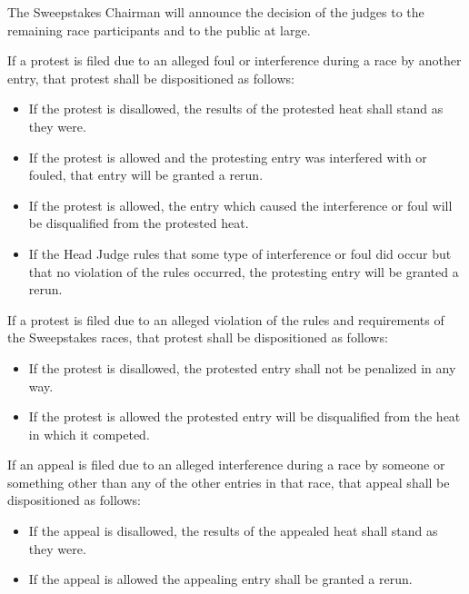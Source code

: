	The Sweepstakes Chairman will announce the decision of the judges to the
	remaining race participants and to the public at large.
	\newline

	\noindent If a protest is filed due to an alleged foul or interference during a race by
	another entry, that protest shall be dispositioned as follows:

	\begin{itemize}

		\item
		If the protest is disallowed, the results of the protested heat shall stand as
		they were.

		\item
		If the protest is allowed and the protesting entry was interfered with or
		fouled, that entry will be granted a rerun.

		\item
		If the protest is allowed, the entry which caused the interference or foul will
		be disqualified from the protested heat.

		\item
		If the Head Judge rules that some type of interference or foul did occur but
		that no violation of the rules occurred, the protesting entry will be granted a
		rerun.

	\end{itemize}

	\noindent If a protest is filed due to an alleged violation of the rules and requirements
	of the Sweepstakes races, that protest shall be dispositioned as follows:

	\begin{itemize}

		\item
		If the protest is disallowed, the protested entry shall not be penalized in any
		way.

		\item
		If the protest is allowed the protested entry will be disqualified from the
		heat in which it competed.

	\end{itemize}

	\noindent If an appeal is filed due to an alleged interference during a race by someone
	or something other than any of the other entries in that race, that appeal
	shall be dispositioned as follows:

	\begin{itemize}

		\item
		If the appeal is disallowed, the results of the appealed heat shall stand as
		they were.

		\item
		If the appeal is allowed the appealing entry shall be granted a rerun.

	\end{itemize}	


